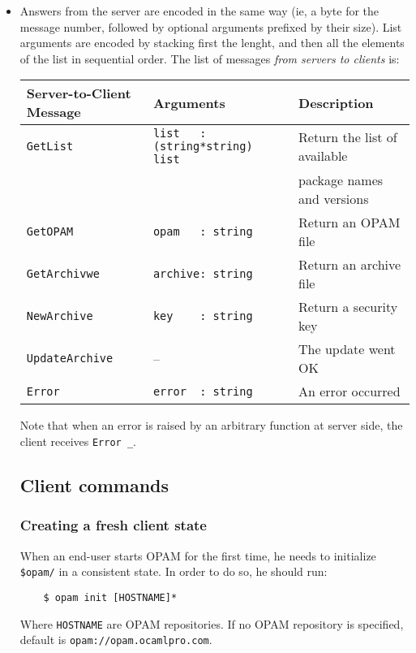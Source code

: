 \documentclass[a4paper,11pt]{article}
\begin{document}
\begin{itemize}
\item Answers from the server are encoded in the same way (ie, a byte
  for the message number, followed by optional arguments prefixed by
  their size). List arguments are encoded by stacking first the
  lenght, and then all the elements of the list in sequential order.
  The list of messages {\em from servers to clients} is:

{\small
\begin{tabular}{|l|l|l|}
\hline
Server-to-Client Message & Arguments & Description \\
\hline
\hline
\verb+GetList+      & \verb+list   : (string*string) list+ & Return the list
of available \\
 & & package names and versions \\
\hline
\verb+GetOPAM+      & \verb+opam   : string+ & Return an OPAM file \\
\hline
\verb+GetArchivwe+  & \verb+archive: string+ & Return an archive file \\
\hline
\verb+NewArchive+   & \verb+key    : string+ & Return a security key \\
\hline
\verb+UpdateArchive+& --                     & The update went OK \\
\hline
\verb+Error+        & \verb+error  : string+ & An error occurred \\
\hline
\end{tabular}
}

Note that when an error is raised by an arbitrary function
 at server side, the client receives \verb|Error _|.

\subsection{Client commands}

\subsubsection{Creating a fresh client state}

When an end-user starts OPAM for the first time, he needs to
initialize {\tt \$opam/} in a consistent state. In order to do so, he
should run:

\begin{verbatim}
    $ opam init [HOSTNAME]*
\end{verbatim}

Where {\tt HOSTNAME} are OPAM repositories. If no OPAM repository is
specified, default is {\tt opam://opam.ocamlpro.com}.


\end{itemize}
\end{document}
